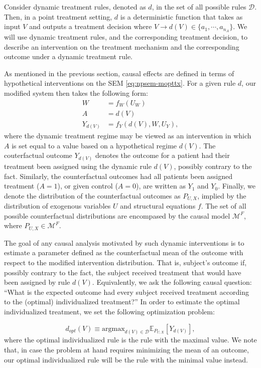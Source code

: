 \documentclass[
  12pt, krantz2,
]{krantz}
\newcommand{\E}{\mathbb{E}}
\newcommand{\1}{\mathbbm{1}}
\theoremstyle{definition}
\theoremstyle{definition}
\theoremstyle{definition}
\theoremstyle{definition}
\theoremstyle{remark}
\begin{document}
Consider dynamic treatment rules, denoted as \(d\), in the set of all possible rules
\(\mathcal{D}\). Then, in a point treatment setting, \(d\) is a deterministic function
that takes as input \(V\) and outputs a treatment decision where
\(V \rightarrow d(V) \in \{a_1, \cdots, a_{n_A} \}\). We will use dynamic treatment rules,
and the corresponding treatment decision, to describe an intervention on the
treatment mechanism and the corresponding outcome under a dynamic treatment rule.

As mentioned in the previous section, causal effects are defined in terms of
hypothetical interventions on the SEM \eqref{eq:npsem-mopttx}. For a given
rule \(d\), our modified system then takes the following form:
\begin{align}
  W &= f_W(U_W) \\ A &= d(V) \\ Y_{d(V)} &= f_Y(d(V), W, U_Y),
  \label{eq:npsem-causal-mopttx}
\end{align}
where the dynamic treatment regime may be viewed as an intervention in which \(A\)
is set equal to a value based on a hypothetical regime \(d(V)\). The couterfactual outcome
\(Y_{d(V)}\) denotes the outcome for a patient had their treatment been assigned using the
dynamic rule \(d(V)\), possibly contrary to the fact. Similarly, the counterfactual
outcomes had all patients been assigned treatment (\(A=1\)), or given control (\(A=0\)), are
written as \(Y_1\) and \(Y_0\). Finally, we denote the distribution of the counterfactual outcomes
as \(P_{U,X}\), implied by the distribution of exogenous variables \(U\) and structural
equations \(f\). The set of all possible counterfactual distributions are encompased
by the causal model \(\mathcal{M}^F\), where \(P_{U,X} \in \mathcal{M}^F\).

The goal of any causal analysis motivated by such dynamic interventions is to
estimate a parameter defined as the counterfactual mean of the outcome with
respect to the modified intervention distribution. That is, subject's outcome if,
possibly contrary to the fact, the subject received treatment that would have been
assigned by rule \(d(V)\). Equivalently, we ask the following causal question:
``What is the expected outcome had every subject received treatment according to the
(optimal) individualized treatment?'' In order to estimate the optimal individualized
treatment, we set the following optimization problem:

\[d_{opt}(V) \equiv \text{argmax}_{d(V) \in \mathcal{D}}
\E_{P_{U,X}}[Y_{d(V)}], \]
where the optimal individualized rule is the rule with the maximal value. We note that, in case
the problem at hand requires minimizing the mean of an outcome, our optimal individualized
rule will be the rule with the minimal value instead.
\end{document}
